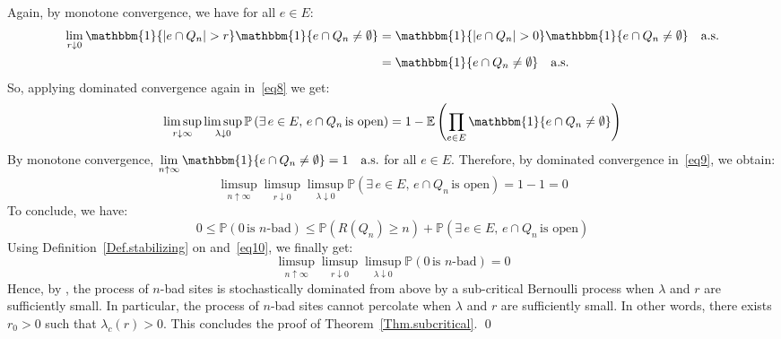 \documentclass[10pt,a4paper]{amsart}
\theoremstyle{exampstyle}
\theoremstyle{exampnotations}
\begin{document}
Again, by monotone convergence, we have for all $e \in E$:
\begin{align*}
\lim_{r \downarrow 0} \mathbbm{1}\lbrace \vert e \cap Q_n \vert > r \rbrace \mathbbm{1}\lbrace e \cap Q_n \neq \emptyset \rbrace &= \mathbbm{1}\lbrace \vert e \cap Q_n \vert > 0 \rbrace \mathbbm{1}\lbrace e \cap Q_n \neq \emptyset \rbrace \quad \text{a.s.} \\ &= \mathbbm{1}\lbrace e \cap Q_n \neq \emptyset \rbrace \quad \text{a.s.}
\end{align*} 
So, applying dominated convergence again in~\eqref{eq8} we get:
\begin{equation}
\label{eq9}
   \limsup_{r \downarrow \infty}\limsup_{\lambda \downarrow 0} \mathbb{P}\left(\exists \, e \in E, \, e \cap Q_n \, \text{is open} \right)=1-\mathbb{E}\left(\prod_{e \in E } \mathbbm{1}\lbrace e \cap Q_n \neq \emptyset \rbrace \right)
\end{equation}
By monotone convergence, $\displaystyle \lim_{n \uparrow \infty}\mathbbm{1}\lbrace e \cap Q_n \neq \emptyset \rbrace = 1 \quad \text{a.s.}$ for all $e \in E$. Therefore, by dominated convergence in~\eqref{eq9}, we obtain:
\begin{equation}
    \label{eq10}
    \limsup_{n \uparrow \infty}\limsup_{r \downarrow 0}\limsup_{\lambda \downarrow 0} \mathbb{P}\left(\exists \, e \in E, \, e \cap Q_n \, \text{is open} \right) = 1-1 = 0
\end{equation}
To conclude, we have: 
\begin{equation*}
    0 \leq \mathbb{P}(0 \, \text{is $n$-bad}) \leq \mathbb{P}(R(Q_n) \geq n) + \mathbb{P}(\exists \, e \in E, \, e \cap Q_n \, \text{is open})
\end{equation*}
Using Definition~\ref{Def.stabilizing} on  and~\eqref{eq10}, we finally get:
\begin{equation*}
     \limsup_{n \uparrow \infty}\limsup_{r \downarrow 0}\limsup_{\lambda \downarrow 0} \mathbb{P}(0 \, \text{is $n$-bad}) =0
\end{equation*}
Hence, by \cite[Theorem 0.0]{liggett_domination_1997}, the process of $n$-bad sites is stochastically dominated from above by a sub-critical Bernoulli process when $\lambda$ and $r$ are sufficiently small. In particular, the process of $n$-bad sites cannot percolate when $\lambda$ and $r$ are sufficiently small. In other words, there exists $r_0 >0$ such that $\lambda_c(r) > 0$. This concludes the proof of Theorem~\ref{Thm.subcritical}. \qed
\end{document}
